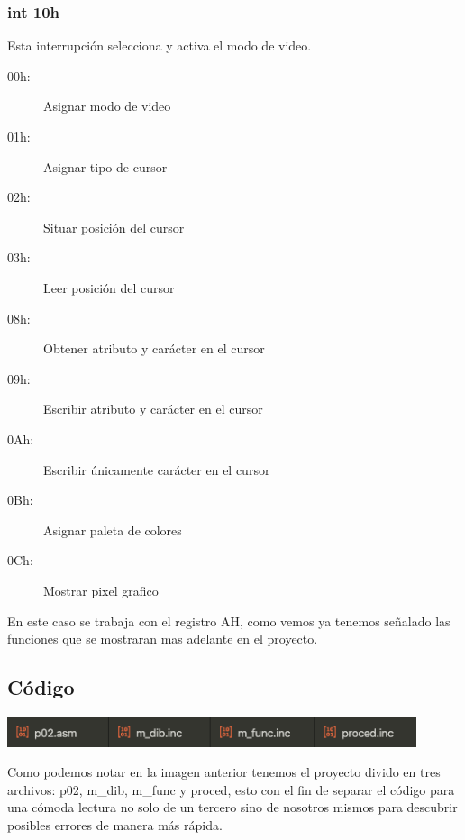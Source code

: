 \documentclass[letterpaper,12 pt,titlepage]{article}
\begin{document}
    \subsubsection{int 10h} 
    
    Esta interrupción selecciona y activa el modo de video.

    \begin{center}
        \begin{minipage}{0.85\linewidth}
            \begin{description}
                \item[00h:] Asignar modo de video
                \item[01h:] Asignar tipo de cursor
                \item[02h:] Situar posición del cursor
                \item[03h:] Leer posición del cursor
                \item[08h:] Obtener atributo y carácter en el cursor
                \item[09h:] Escribir atributo y carácter en el cursor
                \item[0Ah:] Escribir únicamente carácter en el cursor
                \item[0Bh:] Asignar paleta de colores
                \item[0Ch:] Mostrar pixel grafico
            \end{description}
        \end{minipage}
    \end{center}

    En este caso se trabaja con el registro AH, como vemos ya tenemos señalado las funciones que se mostraran mas adelante en el proyecto.

    \subsection{Código}
    \begin{center}
        \includegraphics[width=0.9\textwidth]{img/01.png}
    \end{center}
    Como podemos notar en la imagen anterior tenemos el proyecto divido en tres archivos: p02, m\_dib, m\_func y proced, esto con el fin de separar el código para una cómoda lectura no solo de un tercero sino de nosotros mismos para descubrir posibles errores de manera más rápida.
\end{document}
